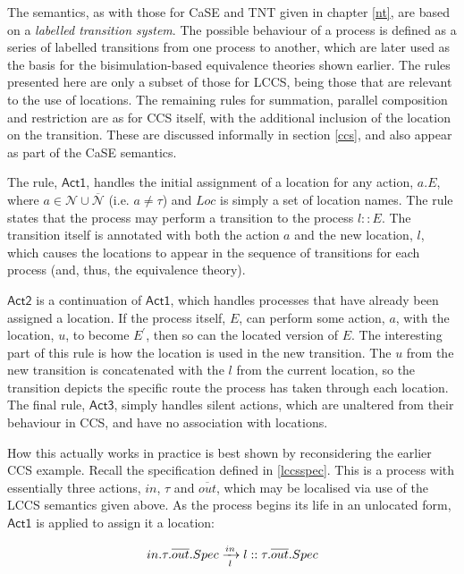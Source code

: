 The semantics, as with those for CaSE and TNT given in chapter
\ref{nt}, are based on a \emph{labelled transition system}.
The possible behaviour of a process is defined as a series of labelled
transitions from one process to another, which are later used as the
basis for the bisimulation-based equivalence theories shown earlier.
The rules presented here are only a subset of those for LCCS, being
those that are relevant to the use of locations.  The remaining rules
for summation, parallel composition and restriction are as for CCS
itself, with the additional inclusion of the location on the transition.
These are discussed informally in section \ref{ccs}, and also appear as
part of the CaSE semantics.  

The rule, $\textsf{Act1}$, handles the initial assignment of a
location for any action, $a.E$, where $a \in \mathcal{N} \cup
\overline{\mathcal{N}}$ (i.e. $a \ne \tau$) and $Loc$ is simply a set
of location names.  The rule states that the process may perform a
transition to the process $l::E$.  The transition itself is annotated
with both the action $a$ and the new location, $l$, which causes the
locations to appear in the sequence of transitions for each process
(and, thus, the equivalence theory).

$\textsf{Act2}$ is a continuation of $\textsf{Act1}$, which handles
processes that have already been assigned a location.  If the process
itself, $E$, can perform some action, $a$, with the location, $u$, to
become $E^\prime$, then so can the located version of $E$.  The
interesting part of this rule is how the location is used in the new
transition.  The $u$ from the new transition is concatenated with the
$l$ from the current location, so the transition depicts the specific
route the process has taken through each location.  The final rule,
$\textsf{Act3}$, simply handles silent actions, which are unaltered from their
behaviour in CCS, and have no association with locations.

How this actually works in practice is best shown by reconsidering the
earlier CCS example.  Recall the specification defined in
\ref{lccsspec}.  This is a process with essentially three actions, $in$,
$\tau$ and $\overline{out}$, which may be localised via use of the LCCS
semantics given above.  As the process begins its life in an unlocated
form, $\textsf{Act1}$ is applied to assign it a location:

\begin{equation}
in.\tau.\overline{out}.Spec \xrightarrow[l]{in}
l::\tau.\overline{out}.Spec
\end{equation}

